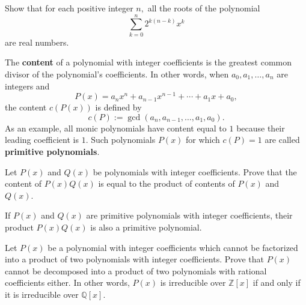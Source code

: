 \begin{question}[name={2014 Putnam}]
    Show that for each positive integer $n,$ all the roots of the polynomial\[\sum_{k=0}^n 2^{k(n-k)}x^k\]are real numbers. 
\end{question}


\begin{tcolorbox}[title={Content of a Polynomial \& Gauss's Lemma}]
    \begin{definition}
        The \textbf{content} of a polynomial with integer coefficients is the greatest common divisor of the polynomial's coefficients. In other words, when $a_0, a_1, \dots ,a_n$ are integers and 
        \[P(x)=a_nx^n+a_{n-1}x^{n-1}+ \cdots + a_1x+a_0,\]
        the content $c(P(x))$ is defined by
        \[c(P) := \gcd(a_n,a_{n-1},\dots,a_1,a_0).\]
        As an example, all monic polynomials have content equal to $1$ because their leading coefficient is $1$. Such polynomials $P(x)$ for which $c(P)=1$ are called \textbf{primitive polynomials}.
    \end{definition}


    \begin{theorem}
        Let $P(x)$ and $Q(x)$ be polynomials with integer coefficients. Prove that the content of $P(x)Q(x)$ is equal to the product of contents of $P(x)$ and $Q(x)$.
    \end{theorem}

    \begin{theorem}
        If $P(x)$ and $Q(x)$ are primitive polynomials with integer coefficients, their product $P(x)Q(x)$ is also a primitive polynomial.
    \end{theorem}
    
    \begin{theorem}
        Let $P(x)$ be a polynomial with integer coefficients which cannot be factorized into a product of two polynomials with integer coefficients. Prove that $P(x)$ cannot be decomposed into a product of two polynomials with rational coefficients either. In other words, $P(x)$ is irreducible over $\mathbb Z[x]$ if and only if it is irreducible over $\mathbb Q[x]$.
    \end{theorem}
\end{tcolorbox}

